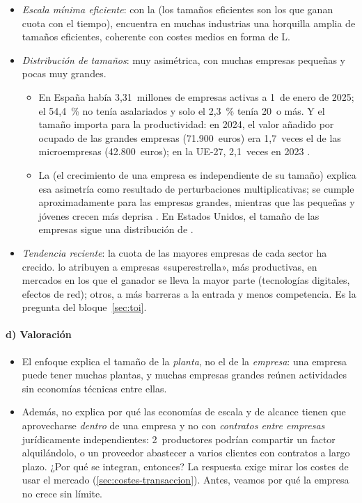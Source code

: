 \documentclass[11pt]{article}
\begin{document}
\begin{itemize}
\item \emph{Escala mínima eficiente}: con la  (los tamaños eficientes son los que ganan cuota con el tiempo), \textcite{Stigler1958Economies} encuentra en muchas industrias una horquilla amplia de tamaños eficientes, coherente con costes medios en forma de L.
\item \emph{Distribución de tamaños}: muy asimétrica, con muchas empresas pequeñas y pocas muy grandes.
  \begin{itemize}
  \item En España había 3,31~millones de empresas activas a 1~de enero de 2025; el 54,4~\% no tenía asalariados y solo el 2,3~\% tenía 20~o más\nocite{INE2025DIRCE}. Y el tamaño importa para la productividad: en 2024, el valor añadido por ocupado de las grandes empresas (71.900~euros) era 1,7~veces el de las microempresas (42.800~euros); en la UE-27, 2,1~veces en 2023\nocite{Eurostat2026SBS} .
  \item La  (el crecimiento de una empresa es independiente de su tamaño) explica esa asimetría como resultado de perturbaciones multiplicativas\nocite{Gibrat1931Inegalites}; se cumple aproximadamente para las empresas grandes, mientras que las pequeñas y jóvenes crecen más deprisa\nocite{Sutton1997Gibrat} . En Estados Unidos, el tamaño de las empresas sigue una distribución de \nocite{Axtell2001Zipf}.
  \end{itemize}
\item \emph{Tendencia reciente}: la cuota de las mayores empresas de cada sector ha crecido. \textcite{AutorEtAl2020Fall} lo atribuyen a empresas «superestrella», más productivas, en mercados en los que el ganador se lleva la mayor parte (tecnologías digitales, efectos de red); otros, a más barreras a la entrada y menos competencia\nocite{Philippon2019Great}. Es la pregunta del bloque~\ref{sec:toi}.
\end{itemize}

\paragraph{d) Valoración}

\begin{itemize}
\item El enfoque explica el tamaño de la \emph{planta}, no el de la \emph{empresa}: una empresa puede tener muchas plantas, y muchas empresas grandes reúnen actividades sin economías técnicas entre ellas.
\item Además, no explica por qué las economías de escala y de alcance tienen que aprovecharse \emph{dentro} de una empresa y no con \emph{contratos entre empresas} jurídicamente independientes: 2~productores podrían compartir un factor alquilándolo, o un proveedor abastecer a varios clientes con contratos a largo plazo\nocite{Teece1980Economies}. ¿Por qué se integran, entonces? La respuesta exige mirar los costes de usar el mercado (\ref{sec:costes-transaccion}). Antes, veamos por qué la empresa no crece sin límite.
\end{itemize}
\end{document}
